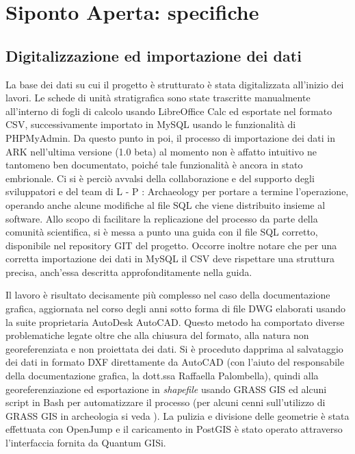 \documentclass{paper}
\begin{document}
\section{Siponto Aperta: specifiche}

    \subsection{Digitalizzazione ed importazione dei dati}

        La base dei dati su cui il progetto è strutturato è stata digitalizzata all'inizio dei lavori. Le schede di unità stratigrafica sono state trascritte manualmente all'interno di fogli di calcolo usando LibreOffice Calc ed esportate nel formato CSV, successivamente importato in MySQL usando le funzionalità di PHPMyAdmin. Da questo punto in poi, il processo di importazione dei dati in ARK nell'ultima versione (1.0 beta) al momento non è affatto intuitivo ne tantomeno ben documentato, poiché tale funzionalità è ancora in stato embrionale. Ci si è perciò avvalsi della collaborazione e del supporto degli sviluppatori e del team di L - P : Archaeology per portare a termine l'operazione, operando anche alcune modifiche al file SQL che viene distribuito insieme al software. Allo scopo di facilitare la replicazione del processo da parte della comunità scientifica, si è messa a punto una guida con il file SQL corretto, disponibile nel repository GIT del progetto. Occorre inoltre notare che per una corretta importazione dei dati in MySQL il CSV deve rispettare una struttura precisa, anch'essa descritta approfonditamente nella guida.

        Il lavoro è risultato decisamente più complesso nel caso della documentazione grafica, aggiornata nel corso degli anni sotto forma di file DWG elaborati usando la suite proprietaria AutoDesk AutoCAD. Questo metodo ha comportato diverse problematiche legate oltre che alla chiusura del formato, alla natura non georeferenziata e non proiettata dei dati. Si è proceduto dapprima al salvataggio dei dati in formato DXF direttamente da AutoCAD (con l'aiuto del responsabile della documentazione grafica, la dott.ssa Raffaella Palombella), quindi alla georeferenziazione ed esportazione in \textit{shapefile} usando GRASS GIS ed alcuni script in Bash per automatizzare il processo (per alcuni cenni sull'utilizzo di GRASS GIS in archeologia si veda \cite{grass-arch}). La pulizia e divisione delle geometrie è stata effettuata con OpenJump e il caricamento in PostGIS è stato operato attraverso l'interfaccia fornita da Quantum GISi.
\end{document}
